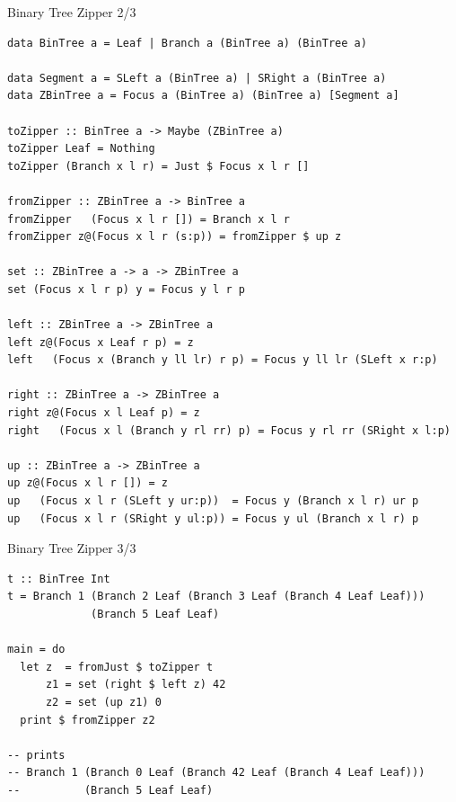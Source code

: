 \documentclass[pdf]{beamer}
\begin{document}
\begin{frame}[fragile]{Binary Tree Zipper 2/3}
  \begin{verbatim}
data BinTree a = Leaf | Branch a (BinTree a) (BinTree a)

data Segment a = SLeft a (BinTree a) | SRight a (BinTree a)
data ZBinTree a = Focus a (BinTree a) (BinTree a) [Segment a]

toZipper :: BinTree a -> Maybe (ZBinTree a)
toZipper Leaf = Nothing
toZipper (Branch x l r) = Just $ Focus x l r []

fromZipper :: ZBinTree a -> BinTree a
fromZipper   (Focus x l r []) = Branch x l r
fromZipper z@(Focus x l r (s:p)) = fromZipper $ up z

set :: ZBinTree a -> a -> ZBinTree a
set (Focus x l r p) y = Focus y l r p

left :: ZBinTree a -> ZBinTree a
left z@(Focus x Leaf r p) = z
left   (Focus x (Branch y ll lr) r p) = Focus y ll lr (SLeft x r:p)

right :: ZBinTree a -> ZBinTree a
right z@(Focus x l Leaf p) = z
right   (Focus x l (Branch y rl rr) p) = Focus y rl rr (SRight x l:p)

up :: ZBinTree a -> ZBinTree a
up z@(Focus x l r []) = z
up   (Focus x l r (SLeft y ur:p))  = Focus y (Branch x l r) ur p
up   (Focus x l r (SRight y ul:p)) = Focus y ul (Branch x l r) p
  \end{verbatim}
\end{frame}

\begin{frame}[fragile]{Binary Tree Zipper 3/3}
  \begin{verbatim}
t :: BinTree Int
t = Branch 1 (Branch 2 Leaf (Branch 3 Leaf (Branch 4 Leaf Leaf)))
             (Branch 5 Leaf Leaf)

main = do
  let z  = fromJust $ toZipper t
      z1 = set (right $ left z) 42
      z2 = set (up z1) 0
  print $ fromZipper z2

-- prints
-- Branch 1 (Branch 0 Leaf (Branch 42 Leaf (Branch 4 Leaf Leaf)))
--          (Branch 5 Leaf Leaf)
  \end{verbatim}
\end{frame}
\end{document}

